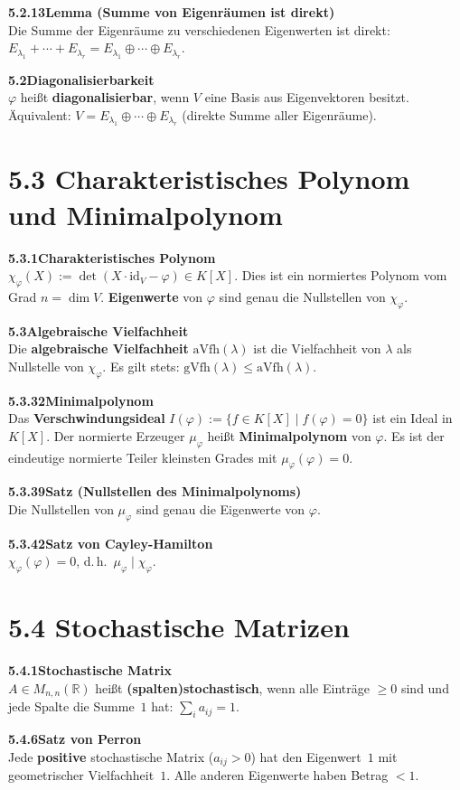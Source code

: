 \documentclass[a4paper,12pt]{article}
\newcommand{\gentry}[3]{%
  \noindent\textbf{#1\quad #2}\nopagebreak\\[0.2em]
  #3\par\smallskip
}
\begin{document}
\gentry{5.2.13}{Lemma (Summe von Eigenräumen ist direkt)}{%
  Die Summe der Eigenräume zu verschiedenen Eigenwerten ist direkt:
  $E_{\lambda_1} + \cdots + E_{\lambda_r} = E_{\lambda_1} \oplus \cdots \oplus E_{\lambda_r}$.
}

\gentry{5.2}{Diagonalisierbarkeit}{%
  $\varphi$ heißt \textbf{diagonalisierbar}, wenn $V$ eine Basis aus Eigenvektoren besitzt.
  Äquivalent: $V = E_{\lambda_1} \oplus \cdots \oplus E_{\lambda_r}$ (direkte Summe aller Eigenräume).
}

\section*{5.3 \quad Charakteristisches Polynom und Minimalpolynom}

\gentry{5.3.1}{Charakteristisches Polynom}{%
  $\chi_\varphi(X) := \det(X \cdot \mathrm{id}_V - \varphi) \in K[X]$. Dies ist ein normiertes Polynom vom Grad $n = \dim V$.
  \textbf{Eigenwerte} von $\varphi$ sind genau die Nullstellen von $\chi_\varphi$.
}

\gentry{5.3}{Algebraische Vielfachheit}{%
  Die \textbf{algebraische Vielfachheit} $\mathrm{aVfh}(\lambda)$ ist die Vielfachheit von $\lambda$ als Nullstelle von $\chi_\varphi$.
  Es gilt stets: $\mathrm{gVfh}(\lambda) \leq \mathrm{aVfh}(\lambda)$.
}

\gentry{5.3.32}{Minimalpolynom}{%
  Das \textbf{Verschwindungsideal} $I(\varphi) := \{f \in K[X] \mid f(\varphi) = 0\}$ ist ein Ideal in $K[X]$.
  Der normierte Erzeuger $\mu_\varphi$ heißt \textbf{Minimalpolynom} von $\varphi$.
  Es ist der eindeutige normierte Teiler kleinsten Grades mit $\mu_\varphi(\varphi) = 0$.
}

\gentry{5.3.39}{Satz (Nullstellen des Minimalpolynoms)}{%
  Die Nullstellen von $\mu_\varphi$ sind genau die Eigenwerte von $\varphi$.
}

\gentry{5.3.42}{Satz von Cayley-Hamilton}{%
  $\chi_\varphi(\varphi) = 0$, d.\,h.\ $\mu_\varphi \mid \chi_\varphi$.
}

\section*{5.4 \quad Stochastische Matrizen}

\gentry{5.4.1}{Stochastische Matrix}{%
  $A \in M_{n,n}(\mathbb{R})$ heißt \textbf{(spalten)stochastisch}, wenn alle Einträge $\geq 0$ sind und jede Spalte die Summe~$1$ hat: $\sum_i a_{ij} = 1$.
}

\gentry{5.4.6}{Satz von Perron}{%
  Jede \textbf{positive} stochastische Matrix ($a_{ij} > 0$) hat den Eigenwert~$1$ mit geometrischer Vielfachheit~$1$. Alle anderen Eigenwerte haben Betrag $< 1$.
}
\end{document}
